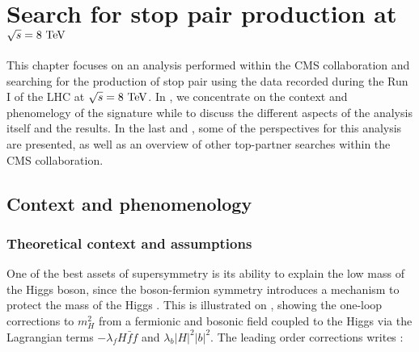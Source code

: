 \setcounter{mtc}{6}
\chapter{Search for stop pair production at $\sqrt{s} = 8~\text{TeV}$}
\minitoc
\newpage

    This chapter focuses on an analysis performed within the CMS collaboration
    and searching for the production of stop pair using the data recorded during
    the Run I of the LHC at $\sqrt{s} = 8~\text{TeV}$. In ,
    we concentrate on the context and phenomelogy of the signature while
     to  discuss
    the different aspects of the analysis itself and the results. In the last
     and , some
    of the perspectives for this analysis are presented, as well as an overview of
    other top-partner searches within the CMS collaboration.

    \section{Context and phenomenology \label{sec:analysis_contextAndPheno}}

        \subsection{Theoretical context and assumptions}


        One of the best assets of supersymmetry is its ability to explain the low mass
        of the Higgs boson, since the boson-fermion symmetry introduces a mechanism to
        protect the mass of the Higgs . This is illustrated on
        , showing the one-loop corrections to $m_H^2$
        from a fermionic and bosonic field coupled to the Higgs via the Lagrangian terms
        $- \lambda_f H \bar{f} f$ and $\lambda_b \left| H \right|^2 \left| b \right|^2$.
        The leading order corrections writes :

